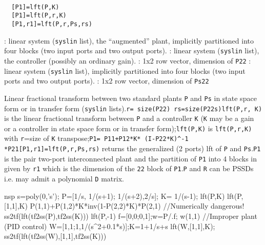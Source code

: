 \begin{mandesc}
   \\ %
\end{mandesc}
\begin{calling_sequence}
\begin{verbatim}
  [P1]=lft(P,K)  
  [P1]=lft(P,r,K)  
  [P1,r1]=lft(P,r,Ps,rs)  
\end{verbatim}
\end{calling_sequence}
\begin{parameters}
  \begin{varlist}
    : linear system (\verb!syslin! list), the ``augmented'' plant, implicitly partitioned into four blocks (two input ports and two output ports).
    : linear system (\verb!syslin! list), the controller (possibly an ordinary gain).
    : 1x2 row vector, dimension of \verb!P22!
    : linear system (\verb!syslin! list), implicitly partitioned into four blocks (two input ports and two output ports).
    : 1x2 row vector, dimension of \verb!Ps22!
  \end{varlist}
\end{parameters}
\begin{mandescription}
  Linear fractional transform between two standard plants
  \verb!P! and \verb!Ps! in state space form or in
  transfer form (\verb!syslin! lists).\verb!r= size(P22) rs=size(P22s)!\verb!lft(P,r, K)! is the linear fractional transform
  between \verb!P! and a controller \verb!K!
  (\verb!K! may be a gain or a controller in state space form
  or in transfer form);\verb!lft(P,K)! is \verb!lft(P,r,K)! with
  \verb!r!=size of \verb!K! transpose;\verb!P1= P11+P12*K* (I-P22*K)^-1 *P21!\verb![P1,r1]=lft(P,r,Ps,rs)! returns the generalized (2
  ports) lft of \verb!P! and \verb!Ps!.\verb!P1! is the pair two-port interconnected plant and the
  partition of \verb!P1! into 4 blocks in given by
  \verb!r1! which is the dimension of the \verb!22!
  block of \verb!P1!.\verb!P! and \verb!R! can be PSSDs i.e. may admit a
  polynomial \verb!D! matrix.
\end{mandescription}
\begin{examples}
  \begin{mintednsp}{nsp}
    s=poly(0,'s');
    P=[1/s, 1/(s+1); 1/(s+2),2/s]; K= 1/(s-1);
    lft(P,K)
    lft(P,[1,1],K)
    P(1,1)+P(1,2)*K*inv(1-P(2,2)*K)*P(2,1)   //Numerically dangerous!
    ss2tf(lft(tf2ss(P),tf2ss(K)))
    lft(P,-1)
    f=[0,0;0,1];w=P/.f; w(1,1)
    //Improper plant (PID control)
    W=[1,1;1,1/(s^2+0.1*s)];K=1+1/s+s
    lft(W,[1,1],K); ss2tf(lft(tf2ss(W),[1,1],tf2ss(K)))
  \end{mintednsp}
\end{examples}
\begin{manseealso}
       
\end{manseealso}
